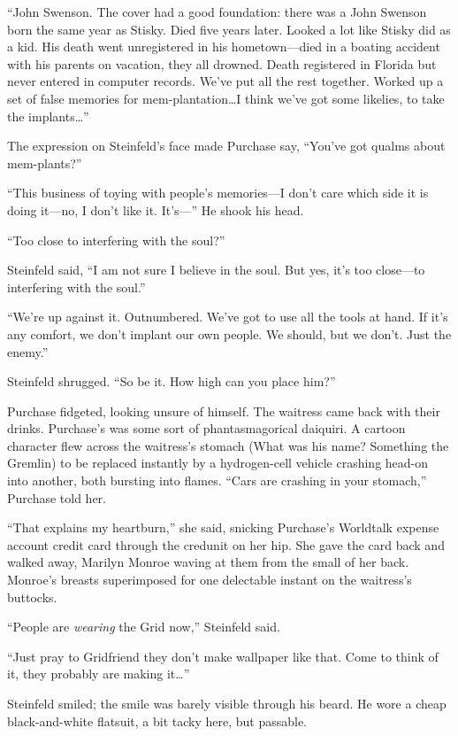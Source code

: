 ``John Swenson. The cover had a good foundation: there was a John Swenson born the same year as Stisky. Died five years later. Looked a lot like Stisky did as a kid. His death went unregistered in his hometown---died in a boating accident with his parents on vacation, they all drowned. Death registered in Florida but never entered in computer records. We've put all the rest together. Worked up a set of false memories for mem-plantation\ldots I think we've got some likelies, to take the implants\ldots ''

The expression on Steinfeld's face made Purchase say, ``You've got qualms about mem-plants?''

``This business of toying with people's memories---I don't care which side it is doing it---no, I don't like it. It's---'' He shook his head.

``Too close to interfering with the soul?''

Steinfeld said, ``I am not sure I believe in the soul. But yes, it's too close---to interfering with the soul.''

``We're up against it. Outnumbered. We've got to use all the tools at hand. If it's any comfort, we don't implant our own people. We should, but we don't. Just the enemy.''

Steinfeld shrugged. ``So be it. How high can you place him?''

Purchase fidgeted, looking unsure of himself. The waitress came back with their drinks. Purchase's was some sort of phantasmagorical daiquiri. A cartoon character flew across the waitress's stomach (What was his name? Something the Gremlin) to be replaced instantly by a hydrogen-cell vehicle crashing head-on into another, both bursting into flames. ``Cars are crashing in your stomach,'' Purchase told her.

``That explains my heartburn,'' she said, snicking Purchase's Worldtalk expense account credit card through the credunit on her hip. She gave the card back and walked away, Marilyn Monroe waving at them from the small of her back. Monroe's breasts superimposed for one delectable instant on the waitress's buttocks.

``People are \textit{wearing} the Grid now,'' Steinfeld said.

``Just pray to Gridfriend they don't make wallpaper like that. Come to think of it, they probably are making it\ldots ''

Steinfeld smiled; the smile was barely visible through his beard. He wore a cheap black-and-white flatsuit, a bit tacky here, but passable.

